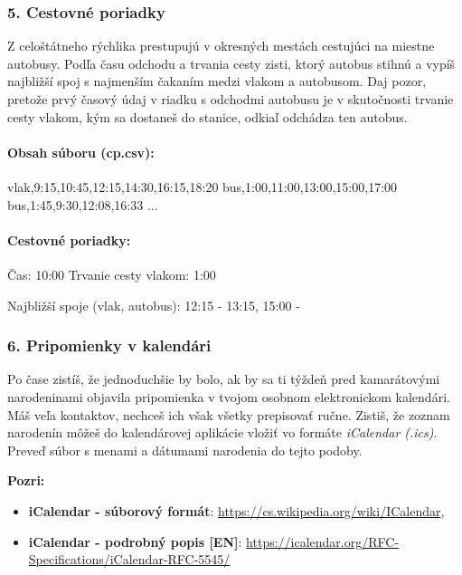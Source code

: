 \subsubsection*{5. Cestovné poriadky}
Z celoštátneho rýchlika prestupujú v okresných mestách cestujúci na miestne autobusy.  Podľa času odchodu a trvania cesty zisti, ktorý autobus stihnú a vypíš najbližší spoj s najmenším čakaním medzi vlakom a autobusom. Daj pozor, pretože prvý časový údaj v riadku s odchodmi autobusu je v skutočnosti trvanie cesty vlakom, kým sa dostaneš do stanice, odkiaľ odchádza ten autobus.

\paragraph{Obsah súboru (cp.csv):}
\begin{code}
vlak,9:15,10:45,12:15,14:30,16:15,18:20
bus,1:00,11:00,13:00,15:00,17:00
bus,1:45,9:30,12:08,16:33
...
\end{code}

\paragraph{Cestovné poriadky:}
\begin{code}
Čas: 10:00
Trvanie cesty vlakom: 1:00

Najbližší spoje (vlak, autobus):
12:15 - 13:15, 15:00 -
\end{code}

\subsubsection*{6. Pripomienky v kalendári}
Po čase zistíš, že jednoduchšie by bolo, ak by sa ti týždeň pred kamarátovými narodeninami objavila pripomienka v tvojom osobnom elektronickom kalendári. Máš veľa kontaktov, nechceš ich však všetky prepisovať ručne. Zistiš, že zoznam narodenín môžeš do kalendárovej aplikácie vložiť vo formáte \textit{iCalendar (.ics)}. Preveď súbor s menami a dátumami narodenia do tejto podoby.

\textbf{Pozri:}
\begin{itemize}
\itemsep0pt
\item \textbf{iCalendar - súborový formát}: \url{https://cs.wikipedia.org/wiki/ICalendar}, 
\item \textbf{iCalendar - podrobný popis [EN]}: \url{https://icalendar.org/RFC-Specifications/iCalendar-RFC-5545/}
\end{itemize}
 

